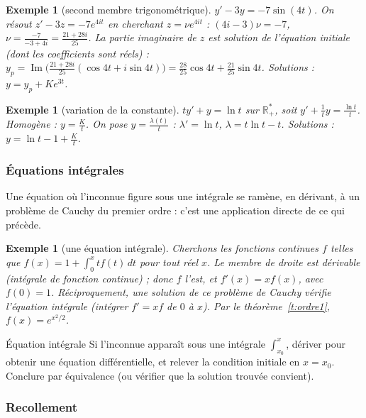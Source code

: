 \documentclass[a4paper,11pt]{article}
\numberwithin{equation}{section}
\numberwithin{figure}{section}
\numberwithin{table}{section}
\theoremstyle{enonce}
\theoremstyle{exemple}
\newtheorem{exemple}[definition]{Exemple}
\theoremstyle{remarque}
\newcommand{\R}{\mathbb{R}}
\newif\ifPT \ifdefined\VERSIONPT \PTtrue \else \PTfalse \fi
\begin{document}
\begin{exemple}[second membre trigonométrique]
$y'-3y=-7\sin(4t)$. On résout $z'-3z=-7e^{4it}$ en cherchant $z=\nu e^{4it}$ : $(4i-3)\nu=-7$, $\nu=\frac{-7}{-3+4i}=\frac{21+28i}{25}$.
La partie imaginaire de $z$ est solution de l'équation initiale (dont les coefficients sont réels) :
$y_p=\operatorname{Im}\!\big(\tfrac{21+28i}{25}(\cos4t+i\sin4t)\big)=\tfrac{28}{25}\cos4t+\tfrac{21}{25}\sin4t$. Solutions :
$y=y_p+Ke^{3t}$.
\end{exemple}

\begin{exemple}[variation de la constante]
$ty'+y=\ln t$ sur $\R_+^*$, soit $y'+\frac1ty=\frac{\ln t}t$. Homogène : $y=\frac Kt$. On pose $y=\frac{\lambda(t)}t$ : $\lambda'=\ln t$,
$\lambda=t\ln t-t$. Solutions : $y=\ln t-1+\frac Kt$.
\end{exemple}

\subsubsection*{Équations intégrales}

Une équation où l'inconnue figure sous une intégrale se ramène, en dérivant, à un problème de Cauchy du premier ordre : c'est
une application directe de ce qui précède.

\begin{exemple}[une équation intégrale]
Cherchons les fonctions continues $f$ telles que $f(x)=1+\int_0^xtf(t)\,dt$ pour tout réel $x$. Le membre de droite est
dérivable (intégrale de fonction continue) ; donc $f$ l'est, et $f'(x)=xf(x)$, avec $f(0)=1$. Réciproquement, une solution de ce
problème de Cauchy vérifie l'équation intégrale (intégrer $f'=xf$ de $0$ à $x$). Par le théorème~\ref{t:ordre1}, $f(x)=e^{x^2/2}$.
\end{exemple}

\begin{methode}{Équation intégrale}\label{m:integrale}
Si l'inconnue apparaît sous une intégrale $\int_{x_0}^x$, dériver pour obtenir une équation différentielle, et relever la
condition initiale en $x=x_0$. Conclure par équivalence (ou vérifier que la solution trouvée convient).
\end{methode}

\ifPT
\subsubsection*{Recollement}\label{ss:recollement}
\end{document}
